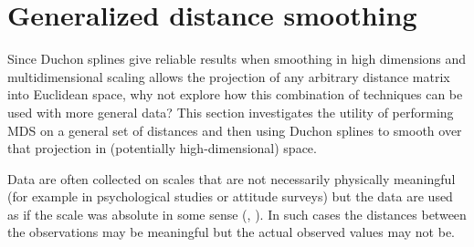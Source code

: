\section{Generalized distance smoothing}
\label{gds-gds-examples}

Since Duchon splines give reliable results when smoothing in high dimensions and multidimensional scaling allows the projection of any arbitrary distance matrix into Euclidean space, why not explore how this combination of techniques can be used with more general data? This section investigates the utility of performing MDS on a general set of distances and then using Duchon splines to smooth over that projection in (potentially high-dimensional) space.

Data are often collected on scales that are not necessarily physically meaningful (for example in psychological studies or attitude surveys) but the data are used as if the scale was absolute in some sense (\cite{cox2007}, \cite{torgerson}). In such cases the distances between the observations may be meaningful but the actual observed values may not be.

